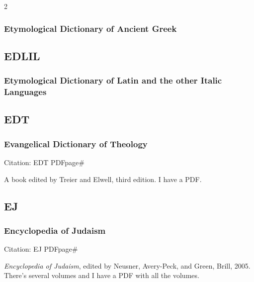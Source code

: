 \begin{multicols}{2}
		\subsubsection*{Etymological Dictionary of Ancient Greek}
		
			\phantom{.}
			
	\subsection*{EDLIL}
	
		\subsubsection*{Etymological Dictionary of Latin and the other Italic Languages}
		
			\phantom{.}
			
	\subsection*{EDT}
	
		\subsubsection*{Evangelical Dictionary of Theology}
		
			Citation:
				EDT PDFpage\#
				
			A book edited by Treier and Elwell, third edition. I have a PDF.
			
	\subsection*{EJ}
	
		\subsubsection*{Encyclopedia of Judaism}
		
			Citation:
				EJ PDFpage\#
		
			\textit{Encyclopedia of Judaism}, edited by Neusner, Avery-Peck, and Green, Brill, 2005. There's several volumes and I have a PDF with all the volumes.
			

\end{multicols}

